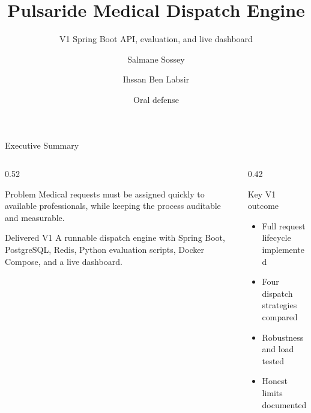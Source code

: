 \documentclass[aspectratio=169,11pt]{beamer}
\title[Pulsaride Dispatch Engine]{Pulsaride Medical Dispatch Engine}
\subtitle{V1 Spring Boot API, evaluation, and live dashboard}
\author[S. Sossey \& I. Ben Labsir]{Salmane Sossey \and Ihssan Ben Labsir}
\institute[Pulsaride Solutions]{Internship project supervised by M. Lyazid Salihi\\Pulsaride Solutions}
\date{Oral defense}
\begin{document}
\begin{frame}
  \titlepage
\end{frame}

\begin{frame}{Executive Summary}
  \begin{columns}[T]
    \begin{column}{0.52\textwidth}
      \begin{block}{Problem}
        Medical requests must be assigned quickly to available professionals, while keeping the process auditable and measurable.
      \end{block}
      \begin{block}{Delivered V1}
        A runnable dispatch engine with Spring Boot, PostgreSQL, Redis, Python evaluation scripts, Docker Compose, and a live dashboard.
      \end{block}
    \end{column}
    \begin{column}{0.42\textwidth}
      \begin{block}{Key V1 outcome}
        \begin{itemize}
          \item Full request lifecycle implemented
          \item Four dispatch strategies compared
          \item Robustness and load tested
          \item Honest limits documented
        \end{itemize}
      \end{block}
    \end{column}
  \end{columns}
\end{frame}
\end{document}
